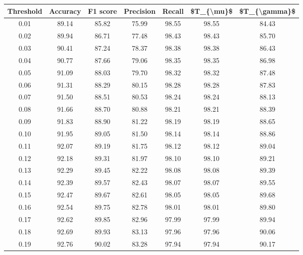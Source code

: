 \begin{tabular}{|c|c|c|c|c|c|c|}
\hline
 Threshold &  Accuracy &  F1 score &  Precision &  Recall &  \$T\_\{\textbackslash mu\}\$ &  \$T\_\{\textbackslash gamma\}\$ \\
\hline
      0.01 &     89.14 &     85.82 &      75.99 &   98.55 &      98.55 &         84.43 \\
      0.02 &     89.94 &     86.71 &      77.48 &   98.43 &      98.43 &         85.70 \\
      0.03 &     90.41 &     87.24 &      78.37 &   98.38 &      98.38 &         86.43 \\
      0.04 &     90.77 &     87.66 &      79.06 &   98.35 &      98.35 &         86.98 \\
      0.05 &     91.09 &     88.03 &      79.70 &   98.32 &      98.32 &         87.48 \\
      0.06 &     91.31 &     88.29 &      80.15 &   98.28 &      98.28 &         87.83 \\
      0.07 &     91.50 &     88.51 &      80.53 &   98.24 &      98.24 &         88.13 \\
      0.08 &     91.66 &     88.70 &      80.88 &   98.21 &      98.21 &         88.39 \\
      0.09 &     91.83 &     88.90 &      81.22 &   98.19 &      98.19 &         88.65 \\
      0.10 &     91.95 &     89.05 &      81.50 &   98.14 &      98.14 &         88.86 \\
      0.11 &     92.07 &     89.19 &      81.75 &   98.12 &      98.12 &         89.04 \\
      0.12 &     92.18 &     89.31 &      81.97 &   98.10 &      98.10 &         89.21 \\
      0.13 &     92.29 &     89.45 &      82.22 &   98.08 &      98.08 &         89.39 \\
      0.14 &     92.39 &     89.57 &      82.43 &   98.07 &      98.07 &         89.55 \\
      0.15 &     92.47 &     89.67 &      82.61 &   98.05 &      98.05 &         89.68 \\
      0.16 &     92.54 &     89.75 &      82.78 &   98.01 &      98.01 &         89.80 \\
      0.17 &     92.62 &     89.85 &      82.96 &   97.99 &      97.99 &         89.94 \\
      0.18 &     92.69 &     89.93 &      83.13 &   97.96 &      97.96 &         90.06 \\
      0.19 &     92.76 &     90.02 &      83.28 &   97.94 &      97.94 &         90.17 \\

\end{tabular}
